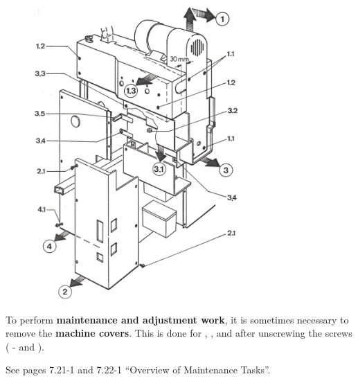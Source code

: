 \begin{figure}[H]
    \centering
    \includegraphics[width=0.7\textwidth]{images/chapter7/machine_cover_removal_diagram.jpg}
    \label{fig:machine_cover_removal}
\end{figure}

To perform \textbf{maintenance and adjustment work}, it is sometimes necessary to remove the \textbf{machine covers}.  
This is done for , , and  after unscrewing the screws ( -  and ).



\setcounter{section}{20}

See pages 7.21-1 and 7.22-1 \enquote{Overview of Maintenance Tasks}.

